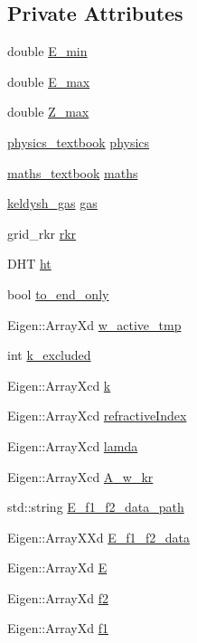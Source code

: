 \subsection*{Private Attributes}
\begin{DoxyCompactItemize}
\item 
double \hyperlink{classpropagation_ab5a753d760a135806a93b9082e8019fb}{E\+\_\+min}
\item 
double \hyperlink{classpropagation_a5d2b4202c82db47a1276c0ef1f7ad8c8}{E\+\_\+max}
\item 
double \hyperlink{classpropagation_ae0b2d1a8fa0e59d37e124a0ba1f12dd2}{Z\+\_\+max}
\item 
\hyperlink{classphysics__textbook}{physics\+\_\+textbook} \hyperlink{classpropagation_a42a6e725e3dd53cf94192bf93c31c8de}{physics}
\item 
\hyperlink{classmaths__textbook}{maths\+\_\+textbook} \hyperlink{classpropagation_ab5a5024c2d06c0dad06c745af7c6416c}{maths}
\item 
\hyperlink{classkeldysh__gas}{keldysh\+\_\+gas} \hyperlink{classpropagation_a4152dc9a226a7ff91aff2338d0bd813f}{gas}
\item 
grid\+\_\+rkr \hyperlink{classpropagation_a3d37531bb5918f972544d242aec7e72b}{rkr}
\item 
D\+HT \hyperlink{classpropagation_a044544975e7fc2ec3df9a55d92f8cc90}{ht}
\item 
bool \hyperlink{classpropagation_a939b7a85171b3e5ce06560a3885ef0ca}{to\+\_\+end\+\_\+only}
\item 
Eigen\+::\+Array\+Xd \hyperlink{classpropagation_a07a80b67a345e3e9d8e934d2265ba288}{w\+\_\+active\+\_\+tmp}
\item 
int \hyperlink{classpropagation_a76f3651eac23a69c1259dc0406fbe0d9}{k\+\_\+excluded}
\item 
Eigen\+::\+Array\+Xcd \hyperlink{classpropagation_a49a30e941421cd5e3f0b62bd1335a767}{k}
\item 
Eigen\+::\+Array\+Xcd \hyperlink{classpropagation_aba601a0df3c63b13215c55d8ade2bcd7}{refractive\+Index}
\item 
Eigen\+::\+Array\+Xcd \hyperlink{classpropagation_a5ae0154dc8db04188ba92e10ba981000}{lamda}
\item 
Eigen\+::\+Array\+Xcd \hyperlink{classpropagation_a4df23dd19a8cca8a4cb032718dc2b258}{A\+\_\+w\+\_\+kr}
\item 
std\+::string \hyperlink{classpropagation_abd78bf6976f2b2d0a3fc82b9cf0d9dc6}{E\+\_\+f1\+\_\+f2\+\_\+data\+\_\+path}
\item 
Eigen\+::\+Array\+X\+Xd \hyperlink{classpropagation_a53ab4838e0e66b55c2ab1398389a22f5}{E\+\_\+f1\+\_\+f2\+\_\+data}
\item 
Eigen\+::\+Array\+Xd \hyperlink{classpropagation_aff3713e9170542e31c952a2d1b760eec}{E}
\item 
Eigen\+::\+Array\+Xd \hyperlink{classpropagation_a747dcaf8f7405a17af992bae39b7fab5}{f2}
\item 
Eigen\+::\+Array\+Xd \hyperlink{classpropagation_a14d6e72396c1c354c6d9986f2d79f85f}{f1}
\end{DoxyCompactItemize}


